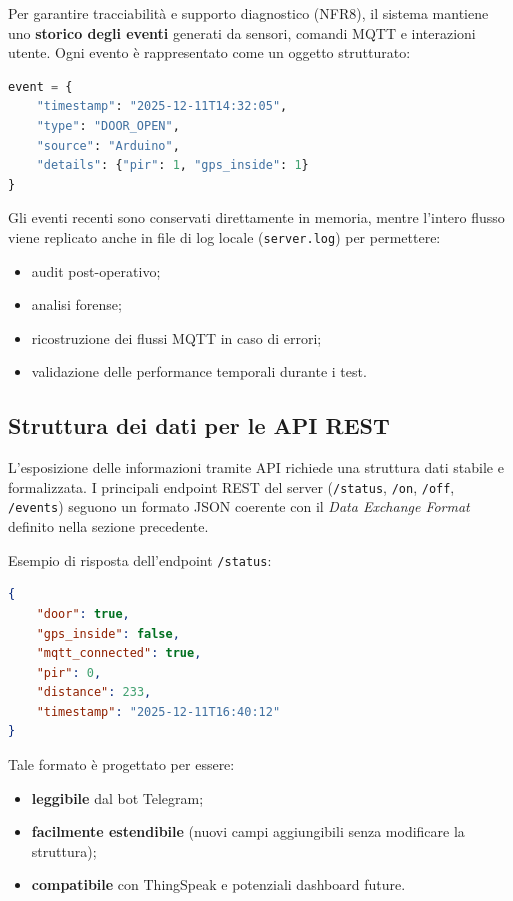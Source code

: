 Per garantire tracciabilità e supporto diagnostico (NFR8), il sistema mantiene
uno \textbf{storico degli eventi} generati da sensori, comandi MQTT e interazioni
utente. Ogni evento è rappresentato come un oggetto strutturato:

\begin{lstlisting}[language=Python]
event = {
    "timestamp": "2025-12-11T14:32:05",
    "type": "DOOR_OPEN",
    "source": "Arduino",
    "details": {"pir": 1, "gps_inside": 1}
}
\end{lstlisting}

Gli eventi recenti sono conservati direttamente in memoria, mentre l'intero flusso
viene replicato anche in file di log locale (\texttt{server.log}) per permettere:

\begin{itemize}
    \item audit post-operativo;
    \item analisi forense;
    \item ricostruzione dei flussi MQTT in caso di errori;
    \item validazione delle performance temporali durante i test.
\end{itemize}

\subsection*{Struttura dei dati per le API REST}

L'esposizione delle informazioni tramite API richiede una struttura dati stabile
e formalizzata. I principali endpoint REST del server (\texttt{/status}, \texttt{/on},
\texttt{/off}, \texttt{/events}) seguono un formato JSON coerente con il
\textit{Data Exchange Format} definito nella sezione precedente.

Esempio di risposta dell'endpoint \texttt{/status}:

\begin{lstlisting}[language=JSON]
{
    "door": true,
    "gps_inside": false,
    "mqtt_connected": true,
    "pir": 0,
    "distance": 233,
    "timestamp": "2025-12-11T16:40:12"
}
\end{lstlisting}

Tale formato è progettato per essere:

\begin{itemize}
    \item \textbf{leggibile} dal bot Telegram;
    \item \textbf{facilmente estendibile} (nuovi campi aggiungibili senza modificare la struttura);
    \item \textbf{compatibile} con ThingSpeak e potenziali dashboard future.
\end{itemize}

